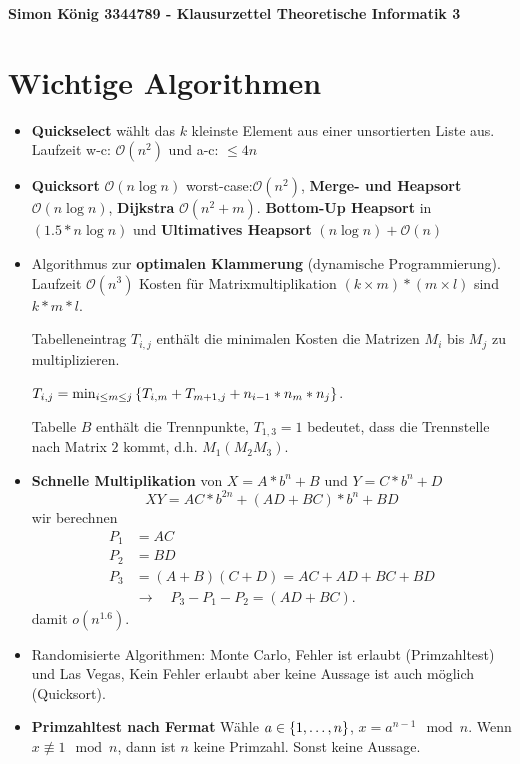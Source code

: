 \documentclass[landscape, 8pt, a4paper]{extarticle}
\newcommand{\simpleset}[1]{\ensuremath\left\{ #1 \right\}}
\renewcommand{\O}{\mathcal O}
\begin{document}
\begin{multicols}{3}
\raggedbottom
	\textbf{Simon König 3344789 - Klausurzettel Theoretische Informatik 3}

	\section{Wichtige Algorithmen}
	\begin{itemize}
		\item \textbf{Quickselect} wählt das $k$ kleinste Element aus einer unsortierten Liste aus. Laufzeit w-c: $\O(n^2)$ und a-c: $\leq4n$
		\item \textbf{Quicksort} $\O(n\log n)$ worst-case:$\O(n^2)$, \textbf{Merge- und Heapsort} $\O(n\log n)$, \textbf{Dijkstra} $\O(n^2+m)$. \textbf{Bottom-Up Heapsort} in $(1.5*n\log n)$ und \textbf{Ultimatives Heapsort} $(n\log n) + \O(n)$

		\item Algorithmus zur \textbf{optimalen Klammerung} (dynamische Programmierung). Laufzeit $\O(n^3)$
		Kosten für Matrixmultiplikation $(k\times m)*(m\times l)$ sind $k*m*l$.

		Tabelleneintrag $T_{i,j}$ enthält die minimalen Kosten die Matrizen $M_i$ bis $M_j$ zu multiplizieren.

		$T_{i,j}=\min_{i\leq m\leq j}\simpleset{T_{i,m}+T_{m+1,j}+n_{i-1}*n_{m}*n_{j}}$.

		Tabelle $B$ enthält die Trennpunkte, $T_{1,3}=1$ bedeutet, dass die Trennstelle nach Matrix $2$ kommt, d.h. $M_1(M_2M_3)$.

		\item \textbf{Schnelle Multiplikation} von $X=A*b^n+B$ und $Y=C*b^n+D$
		\begin{equation*}
			XY=AC*b^{2n}+(AD+BC)*b^n+BD
		\end{equation*}
		wir berechnen
		\begin{align*}
			P_1&=AC\\
			P_2&=BD\\
			P_3&=(A+B)(C+D)=AC+AD+BC+BD\\
			&\rightarrow \quad P_3-P_1-P_2=(AD+BC).
		\end{align*}
		damit $o(n^{1.6})$.

		\item Randomisierte Algorithmen: Monte Carlo, Fehler ist erlaubt (Primzahltest) und Las Vegas, Kein Fehler erlaubt aber keine Aussage ist auch möglich (Quicksort). 

		\item \textbf{Primzahltest nach Fermat} Wähle $a\in\simpleset{1,\ldots,n}$, $x=a^{n-1}\mod n$. Wenn $x\not\equiv 1\mod n$, dann ist $n$ keine Primzahl. Sonst keine Aussage.


\end{itemize}
\end{multicols}
\end{document}
